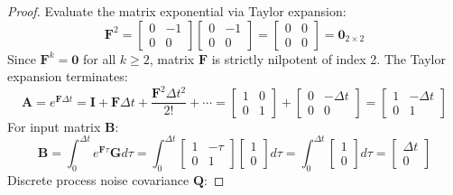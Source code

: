 \documentclass[11pt, a4paper]{article}
\begin{document}
\begin{proof}
Evaluate the matrix exponential via Taylor expansion:
\begin{equation}
    \mathbf{F}^2 = \begin{bmatrix} 0 & -1 \\ 0 & 0 \end{bmatrix} \begin{bmatrix} 0 & -1 \\ 0 & 0 \end{bmatrix} = \begin{bmatrix} 0 & 0 \\ 0 & 0 \end{bmatrix} = \mathbf{0}_{2\times 2}
\end{equation}
Since $\mathbf{F}^k = \mathbf{0}$ for all $k \ge 2$, matrix $\mathbf{F}$ is strictly nilpotent of index 2. The Taylor expansion terminates:
\begin{equation}
    \mathbf{A} = e^{\mathbf{F}\Delta t} = \mathbf{I} + \mathbf{F} \Delta t + \frac{\mathbf{F}^2 \Delta t^2}{2!} + \cdots = \begin{bmatrix} 1 & 0 \\ 0 & 1 \end{bmatrix} + \begin{bmatrix} 0 & -\Delta t \\ 0 & 0 \end{bmatrix} = \begin{bmatrix} 1 & -\Delta t \\ 0 & 1 \end{bmatrix}
\end{equation}
For input matrix $\mathbf{B}$:
\begin{equation}
    \mathbf{B} = \int_0^{\Delta t} e^{\mathbf{F}\tau} \mathbf{G} d\tau = \int_0^{\Delta t} \begin{bmatrix} 1 & -\tau \\ 0 & 1 \end{bmatrix} \begin{bmatrix} 1 \\ 0 \end{bmatrix} d\tau = \int_0^{\Delta t} \begin{bmatrix} 1 \\ 0 \end{bmatrix} d\tau = \begin{bmatrix} \Delta t \\ 0 \end{bmatrix}
\end{equation}
Discrete process noise covariance $\mathbf{Q}$:

\end{proof}
\end{document}
